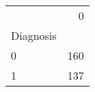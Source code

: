 \begin{tabular}{lr}
\toprule
{} &    0 \\
Diagnosis &      \\
\midrule
0         &  160 \\
1         &  137 \\
\bottomrule
\end{tabular}
